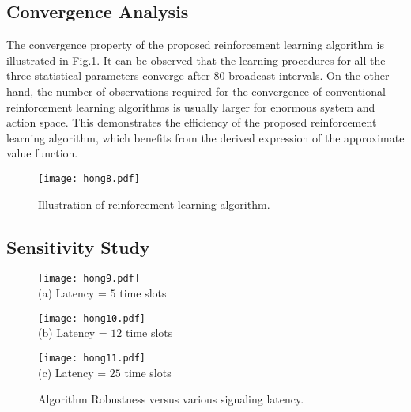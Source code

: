 \subsection{Convergence Analysis}
\label{subsec:converge}
The convergence property of the proposed reinforcement learning algorithm is illustrated in Fig.\ref{fig:rl_plot}.
It can be observed that the learning procedures for all the three statistical parameters converge after $80$ broadcast intervals.
On the other hand, the number of observations required for the convergence of conventional reinforcement learning algorithms is usually larger for enormous system and action space.
This demonstrates the efficiency of the proposed reinforcement learning algorithm, which benefits from the derived expression {of} the approximate value function.
\begin{figure}[ht!]
    \centering
    \texttt{[image: hong8.pdf]}
    \caption{Illustration of reinforcement learning algorithm.} 
    \label{fig:rl_plot}
\end{figure}

\subsection{Sensitivity Study}
\label{subsec:advance}
\begin{figure*}[ht!]                                                                %
    \centering                                                                      %
    \begin{minipage}[b]{0.30\textwidth}                                             %
        \texttt{[image: hong9.pdf]} \\              %
        (a) Latency = $5$ time slots
    \end{minipage}                                                                  %
    \begin{minipage}[b]{0.30\textwidth}                                             %
        \texttt{[image: hong10.pdf]} \\             %
        (b) Latency = $12$ time slots
    \end{minipage}                                                                  %
    \begin{minipage}[b]{0.30\textwidth}                                             %
        \texttt{[image: hong11.pdf]} \\               %
        (c) Latency = $25$ time slots
    \end{minipage}                                                                  %
    \caption{Algorithm Robustness versus various signaling latency.}                %
    \label{fig:ss_signal}                                                           %
\end{figure*}                                                                       %


